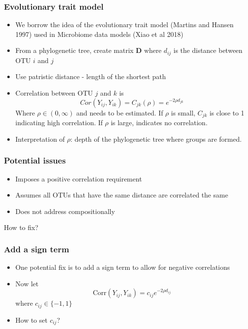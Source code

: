 \documentclass{beamer}
\begin{document}
\begin{frame}
\frametitle{Evolutionary trait model}
\begin{itemize}
  \item We borrow the idea of the evolutionary trait model (Martins and Hansen 1997) used in Microbiome data models (Xiao et al 2018)
  \item From a phylogenetic tree, create matrix $\mathbf{D}$ where $d_{ij}$ is the distance between OTU $i$ and $j$
  \item Use patristic distance - length of the shortest path
  \item Correlation between OTU $j$ and $k$ is
  $$Cor(Y_{ij}, Y_{ik}) = C_{jk}(\rho) = e^{-2\rho d_{jk}}$$ Where $\rho \in (0,\infty)$ and needs to be estimated.
If $\rho$ is small, $C_{jk}$ is close to 1 indicating high correlation. If $\rho$ is large, indicates no correlation.
  \item Interpretation of $\rho$: depth of the phylogenetic tree where groups are formed.


\end{itemize}
\end{frame}
\begin{frame}
\frametitle{Potential issues}

\begin{itemize}
  \item Imposes a positive correlation requirement
  \item Assumes all OTUs that have the same distance are correlated the same
  \item Does not address compositionally
\end{itemize}

How to fix?

\end{frame}
\begin{frame}
\frametitle{Add a sign term}

\begin{itemize}
  \item One potential fix is to add a sign term to allow for negative correlations
  \item Now let
  $$\text{Corr}(Y_{ij},Y_{ik}) = c_{ij}e^{-2\rho d_{ij}}$$
  where $c_{ij} \in \{-1,1\}$

  \item How to set $c_{ij}$?


\end{itemize}
\end{frame}
\end{document}
